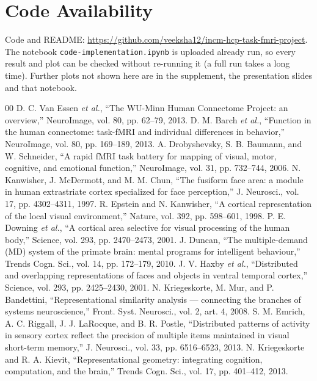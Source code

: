 \documentclass[conference]{IEEEtran}
\begin{document}
\section*{Code Availability}
Code and README: \url{https://github.com/veeksha12/incm-hcp-task-fmri-project}. The notebook \texttt{code-implementation.ipynb} is uploaded already run, so every result and plot can be checked without re-running it (a full run takes a long time). Further plots not shown here are in the supplement, the presentation slides and that notebook.

\begin{thebibliography}{00}
 D. C. Van Essen \emph{et al.}, ``The WU-Minn Human Connectome Project: an overview,'' NeuroImage, vol. 80, pp. 62--79, 2013.
 D. M. Barch \emph{et al.}, ``Function in the human connectome: task-fMRI and individual differences in behavior,'' NeuroImage, vol. 80, pp. 169--189, 2013.
 A. Drobyshevsky, S. B. Baumann, and W. Schneider, ``A rapid fMRI task battery for mapping of visual, motor, cognitive, and emotional function,'' NeuroImage, vol. 31, pp. 732--744, 2006.
 N. Kanwisher, J. McDermott, and M. M. Chun, ``The fusiform face area: a module in human extrastriate cortex specialized for face perception,'' J. Neurosci., vol. 17, pp. 4302--4311, 1997.
 R. Epstein and N. Kanwisher, ``A cortical representation of the local visual environment,'' Nature, vol. 392, pp. 598--601, 1998.
 P. E. Downing \emph{et al.}, ``A cortical area selective for visual processing of the human body,'' Science, vol. 293, pp. 2470--2473, 2001.
 J. Duncan, ``The multiple-demand (MD) system of the primate brain: mental programs for intelligent behaviour,'' Trends Cogn. Sci., vol. 14, pp. 172--179, 2010.
 J. V. Haxby \emph{et al.}, ``Distributed and overlapping representations of faces and objects in ventral temporal cortex,'' Science, vol. 293, pp. 2425--2430, 2001.
 N. Kriegeskorte, M. Mur, and P. Bandettini, ``Representational similarity analysis --- connecting the branches of systems neuroscience,'' Front. Syst. Neurosci., vol. 2, art. 4, 2008.
 S. M. Emrich, A. C. Riggall, J. J. LaRocque, and B. R. Postle, ``Distributed patterns of activity in sensory cortex reflect the precision of multiple items maintained in visual short-term memory,'' J. Neurosci., vol. 33, pp. 6516--6523, 2013.
 N. Kriegeskorte and R. A. Kievit, ``Representational geometry: integrating cognition, computation, and the brain,'' Trends Cogn. Sci., vol. 17, pp. 401--412, 2013.

\end{thebibliography}
\end{document}
